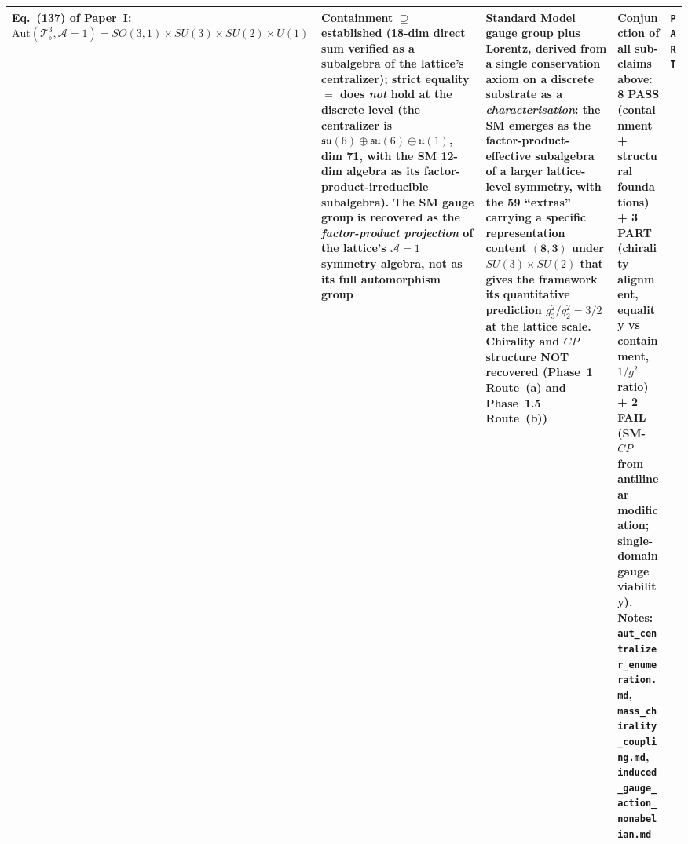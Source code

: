 {\begin{longtable}{@{}p{3.2cm}p{3.6cm}p{3.4cm}p{3.8cm}p{1.0cm}@{}}
\hline
\textbf{Eq.~(137) of Paper~I:}
$\mathrm{Aut}(\mathcal{T}_\diamond^3, \mathcal{A}=1) = SO(3,1) \times SU(3) \times SU(2) \times U(1)$
    & Containment $\supseteq$ established (18-dim direct sum
      verified as a subalgebra of the lattice's centralizer);
      strict equality $=$ does \emph{not} hold at the discrete
      level (the centralizer is $\mathfrak{su}(6) \oplus
      \mathfrak{su}(6) \oplus \mathfrak{u}(1)$, dim 71, with the
      SM 12-dim algebra as its factor-product-irreducible
      subalgebra).  The SM gauge group is recovered as the
      \emph{factor-product projection} of the lattice's
      $\mathcal{A}=1$ symmetry algebra, not as its full
      automorphism group
    & Standard Model gauge group plus Lorentz, derived from a
      single conservation axiom on a discrete substrate as a
      \emph{characterisation}: the SM emerges as the
      factor-product-effective subalgebra of a larger
      lattice-level symmetry, with the 59 ``extras'' carrying a
      specific representation content $(\mathbf{8}, \mathbf{3})$
      under $SU(3) \times SU(2)$ that gives the framework its
      quantitative prediction $g_3^2/g_2^2 = 3/2$ at the lattice
      scale.  Chirality and $CP$ structure NOT recovered (Phase~1
      Route~(a) and Phase~1.5 Route~(b))
    & Conjunction of all sub-claims above: 8 PASS (containment +
      structural foundations) + 3 PART (chirality alignment,
      equality vs containment, $1/g^2$ ratio) + 2 FAIL (SM-$CP$
      from antilinear modification; single-domain gauge
      viability).  Notes:
      \nolinkurl{aut_centralizer_enumeration.md},
      \nolinkurl{mass_chirality_coupling.md},
      \nolinkurl{induced_gauge_action_nonabelian.md}
    & \texttt{PART} \\

\hline
\end{longtable}
}
